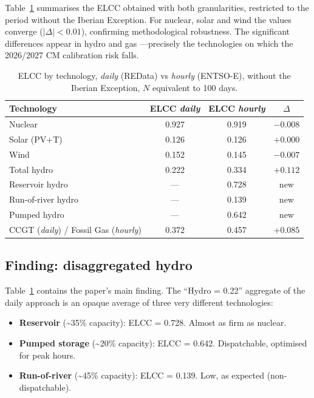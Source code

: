 \documentclass[11pt,a4paper]{article}
\begin{document}
Table~\ref{tab:elcc-comparison} summarises the ELCC obtained with both
granularities, restricted to the period without the Iberian Exception. For nuclear,
solar and wind the values converge ($|\Delta| < 0.01$), confirming methodological
robustness. The significant differences appear in hydro and gas ---precisely the
technologies on which the 2026/2027 CM calibration risk falls.

\begin{table}[ht]
\centering
\caption{ELCC by technology, \emph{daily} (REData) vs \emph{hourly} (ENTSO-E),
         without the Iberian Exception, $N$ equivalent to 100 days.}
\label{tab:elcc-comparison}
\begin{tabular}{lccc}
\toprule
Technology & ELCC \emph{daily} & ELCC \emph{hourly} & $\Delta$ \\
\midrule
Nuclear                       & 0.927 & 0.919 & $-0.008$ \\
Solar (PV+T)                  & 0.126 & 0.126 & $+0.000$ \\
Wind                          & 0.152 & 0.145 & $-0.007$ \\
Total hydro                   & 0.222 & 0.334 & $+0.112$ \\
\quad Reservoir hydro         & ---   & 0.728 & new      \\
\quad Run-of-river hydro      & ---   & 0.139 & new      \\
\quad Pumped hydro            & ---   & 0.642 & new      \\
CCGT (\emph{daily}) / Fossil Gas (\emph{hourly}) & 0.372 & 0.457 & $+0.085$ \\
\bottomrule
\end{tabular}
\end{table}

\subsection{Finding: disaggregated hydro}

Table~\ref{tab:elcc-comparison} contains the paper's main finding. The
``Hydro = 0.22'' aggregate of the daily approach is an opaque average of three very
different technologies:

\begin{itemize}
\item \textbf{Reservoir} (\textasciitilde 35\% capacity): ELCC = 0.728. Almost as
      firm as nuclear.
\item \textbf{Pumped storage} (\textasciitilde 20\% capacity): ELCC = 0.642.
      Dispatchable, optimised for peak hours.
\item \textbf{Run-of-river} (\textasciitilde 45\% capacity): ELCC = 0.139. Low, as
      expected (non-dispatchable).
\end{itemize}
\end{document}
